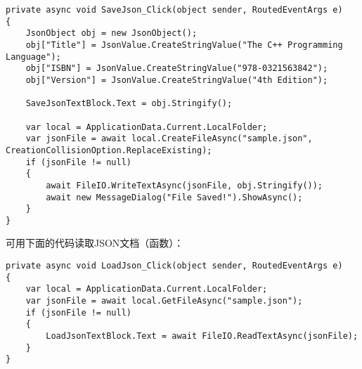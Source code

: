 \begin{lstlisting}[style=CSharpStyle]
private async void SaveJson_Click(object sender, RoutedEventArgs e)
{
	JsonObject obj = new JsonObject();
	obj["Title"] = JsonValue.CreateStringValue("The C++ Programming Language");
	obj["ISBN"] = JsonValue.CreateStringValue("978-0321563842");
	obj["Version"] = JsonValue.CreateStringValue("4th Edition");
	
	SaveJsonTextBlock.Text = obj.Stringify();
	
	var local = ApplicationData.Current.LocalFolder;
	var jsonFile = await local.CreateFileAsync("sample.json", CreationCollisionOption.ReplaceExisting);
	if (jsonFile != null)
	{
		await FileIO.WriteTextAsync(jsonFile, obj.Stringify());
		await new MessageDialog("File Saved!").ShowAsync();
	}
}
\end{lstlisting}

可用下面的代码读取JSON文档（函数）：

\begin{lstlisting}[style=CSharpStyle]
private async void LoadJson_Click(object sender, RoutedEventArgs e)
{
	var local = ApplicationData.Current.LocalFolder;
	var jsonFile = await local.GetFileAsync("sample.json");
	if (jsonFile != null)
	{
		LoadJsonTextBlock.Text = await FileIO.ReadTextAsync(jsonFile);
	}
}
\end{lstlisting}
